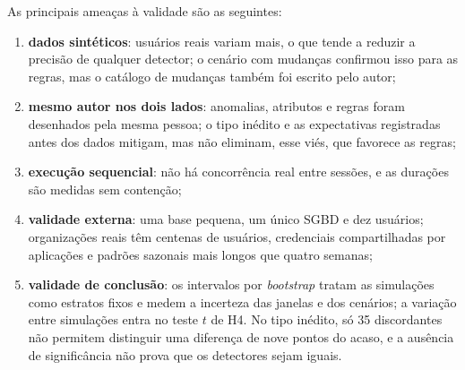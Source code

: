 As principais ameaças à validade são as seguintes:

\begin{enumerate}[label=\alph*)]
    \item \textbf{dados sintéticos}: usuários reais variam mais, o que tende a reduzir a
          precisão de qualquer detector; o cenário com mudanças confirmou isso para as regras,
          mas o catálogo de mudanças também foi escrito pelo autor;
    \item \textbf{mesmo autor nos dois lados}: anomalias, atributos e regras foram desenhados
          pela mesma pessoa; o tipo inédito e as expectativas registradas antes dos dados
          mitigam, mas não eliminam, esse viés, que favorece as regras;
    \item \textbf{execução sequencial}: não há concorrência real entre sessões, e as durações
          são medidas sem contenção;
    \item \textbf{validade externa}: uma base pequena, um único SGBD e dez usuários;
          organizações reais têm centenas de usuários, credenciais compartilhadas por aplicações
          e padrões sazonais mais longos que quatro semanas;
    \item \textbf{validade de conclusão}: os intervalos por \textit{bootstrap} tratam as
          simulações como estratos fixos e medem a incerteza das janelas e dos cenários; a
          variação entre simulações entra no teste $t$ de H4. No tipo inédito, só 35
          discordantes não permitem distinguir uma diferença de nove pontos do acaso, e a
          ausência de significância não prova que os detectores sejam iguais.
\end{enumerate}
